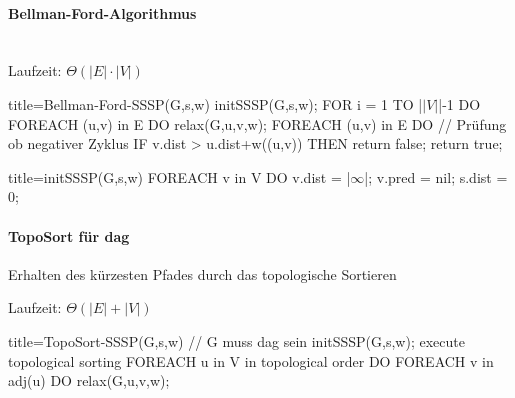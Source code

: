 \documentclass[
    ngerman,
    color=3b,
    dark_mode,
    load_common, %
    summary,
    boxarc,
]{rubos-tuda-template}
\begin{document}
\paragraph{Bellman-Ford-Algorithmus}\mbox{}\\
Laufzeit: $\Theta(|E| \cdot |V|)$
\begin{codeBlock}[autogobble,escapeinside=||]{title={Bellman-Ford-SSSP(G,s,w)}}
    initSSSP(G,s,w);
    FOR i = 1 TO |$\vert V\vert$|-1 DO
        FOREACH (u,v) in E DO
            relax(G,u,v,w);
    FOREACH (u,v) in E DO   // Prüfung ob negativer Zyklus
        IF v.dist > u.dist+w((u,v)) THEN
            return false;
    return true;
\end{codeBlock}
\begin{codeBlock}[autogobble,escapeinside=||]{title={initSSSP(G,s,w)}}
    FOREACH v in V DO
        v.dist = |$\infty$|;
        v.pred = nil;
    s.dist = 0;
\end{codeBlock}
\vspace{-1em}
\paragraph{TopoSort für dag}\mbox{}
\begin{idea}
    Erhalten des kürzesten Pfades durch das topologische Sortieren
\end{idea}
Laufzeit: $\Theta(|E| + |V|)$

\begin{codeBlock}[autogobble]{title={TopoSort-SSSP(G,s,w)    // G muss dag sein}}
    initSSSP(G,s,w);
    execute topological sorting
    FOREACH u in V in topological order DO
        FOREACH v in adj(u) DO
            relax(G,u,v,w);
\end{codeBlock}

\vspace{-1em}
\end{document}

